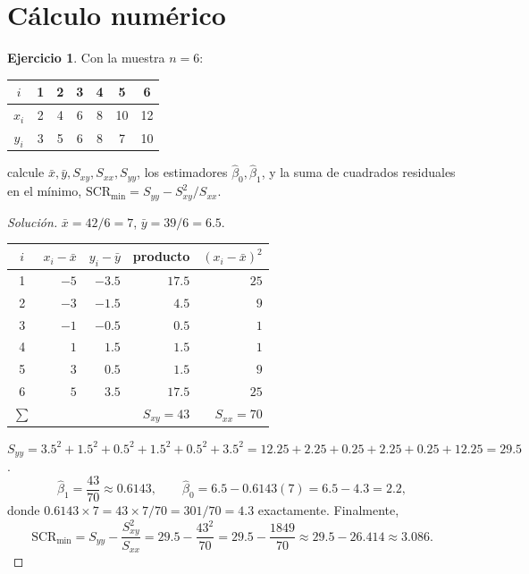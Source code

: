 \documentclass[11pt,a4paper,oneside]{article}
\theoremstyle{plain}
\theoremstyle{definition}
\newtheorem{exercise}[teorema]{Ejercicio}
\newcommand{\SCR}{\mathrm{SCR}}
\begin{document}
\section{Cálculo numérico}

\begin{exercise}\label{ej:numerico-grande}
Con la muestra $n=6$:
\begin{center}
\begin{tabular}{@{}ccccccc@{}}
\toprule
$i$ & 1 & 2 & 3 & 4 & 5 & 6 \\
\midrule
$x_i$ & 2 & 4 & 6 & 8 & 10 & 12 \\
$y_i$ & 3 & 5 & 6 & 8 & 7 & 10 \\
\bottomrule
\end{tabular}
\end{center}
calcule $\bar x,\bar y,S_{xy},S_{xx},S_{yy}$, los estimadores
$\hat\beta_0,\hat\beta_1$, y la suma de cuadrados residuales en el
mínimo, $\SCR_{\min}=S_{yy}-S_{xy}^2/S_{xx}$.
\end{exercise}
\begin{proof}[Solución]
$\bar x=42/6=7$, $\bar y=39/6=6.5$.
\begin{center}
\begin{tabular}{@{}crrrr@{}}
\toprule
$i$ & $x_i-\bar x$ & $y_i-\bar y$ & producto & $(x_i-\bar x)^2$ \\
\midrule
1 & $-5$ & $-3.5$ & $17.5$ & $25$ \\
2 & $-3$ & $-1.5$ & $4.5$  & $9$  \\
3 & $-1$ & $-0.5$ & $0.5$  & $1$  \\
4 & $1$  & $1.5$  & $1.5$  & $1$  \\
5 & $3$  & $0.5$  & $1.5$  & $9$  \\
6 & $5$  & $3.5$  & $17.5$ & $25$ \\
\midrule
$\sum$ & & & $S_{xy}=43$ & $S_{xx}=70$ \\
\bottomrule
\end{tabular}
\end{center}
$S_{yy}=3.5^2+1.5^2+0.5^2+1.5^2+0.5^2+3.5^2 = 12.25+2.25+0.25+2.25+0.25+12.25=29.5$.
\[
  \hat\beta_1 = \frac{43}{70} \approx 0.6143, \qquad
  \hat\beta_0 = 6.5 - 0.6143(7) = 6.5-4.3 = 2.2,
\]
donde $0.6143\times7=43\times7/70=301/70=4.3$ exactamente. Finalmente,
\[
  \SCR_{\min} = S_{yy}-\frac{S_{xy}^2}{S_{xx}} = 29.5-\frac{43^2}{70}
  = 29.5-\frac{1849}{70} \approx 29.5-26.414 \approx 3.086.
\]
\end{proof}
\end{document}

